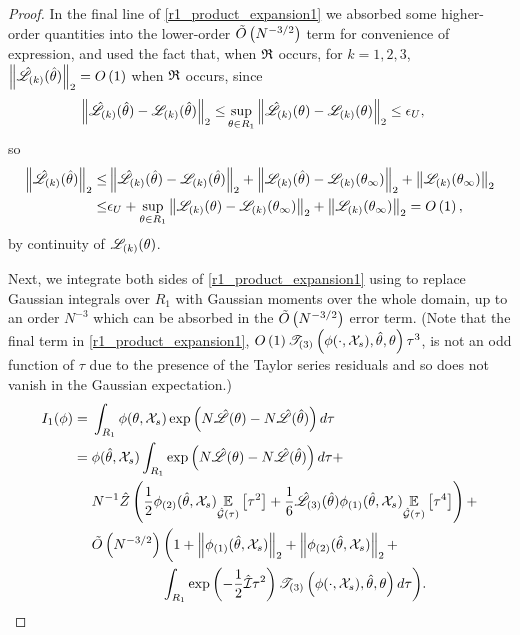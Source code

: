 \begin{lem}
\begin{proof}
In the final line of \eqref{r1_product_expansion1} we absorbed some higher-order
quantities into the lower-order $\tilde{O}\left(N^{-3/2}\right)$ term for convenience of
expression, and used the fact that, when $\mathfrak{R}$ occurs, for $k=1,2,3$,
$\left\Vert \hat{\mathscr{L}}_{(k)}(\hat\theta)\right\Vert_2 = O\left(1\right)$ when $\mathfrak{R}$ occurs, since
%
\begin{align*}
%
\norm{\likhatk{k}(\thetahat) - \likk{k}(\thetahat)}_2 \le&
    \sup_{\theta \in R_1} \norm{\likhatk{k}(\theta) - \likk{k}(\theta)}_2 \le
    \epsilon_U,
%
\end{align*}
%
so
%
\begin{align*}
%
\norm{\likhatk{k}(\thetahat)}_2 \le&
    \norm{\likhatk{k}(\thetahat) - \likk{k}(\thetahat)}_2 +
    \norm{\likk{k}(\thetahat) - \likk{k}(\thetatrue)}_2 +
    \norm{\likk{k}(\thetatrue)}_2 \\
\le&
    \epsilon_U +
    \sup_{\theta \in R_1} \norm{\likk{k}(\theta) - \likk{k}(\thetatrue)}_2 + \norm{\likk{k}(\thetatrue)}_2
= \ord{1},
%
\end{align*}
%
by continuity of $\mathscr{L}_{(k)}(\theta)$.

Next, we integrate both sides of \eqref{r1_product_expansion1} using
 to replace Gaussian integrals over $R_1$
with Gaussian moments over the whole domain, up to an order $N^{-3}$ which can
be absorbed in the $\tilde{O}\left(N^{-3/2}\right)$ error term.  (Note that the final term in
\eqref{r1_product_expansion1}, $O\left(1\right) \mathscr{T}_{(3)}\left(\phi(\cdot, {\mathcal{X}}_s), \hat\theta,
\theta\right) \tau^3$, is not an odd function of $\tau$ due to the
presence of the Taylor series residuals and so does not vanish
in the Gaussian expectation.)
%
\begin{align*}
%
I_1(\phi) ={}&
\int_{R_1} \phi(\theta, \xvec_s)
   \exp\left(N \likhat(\theta) - N \likhat(\thetahat)\right) d \tau
\\
={}&
\phi(\thetahat, \xvec_s)
\int_{R_1} \exp\left(
    N \likhat(\theta) - N \likhat(\thetahat)
\right) d\tau +
\\{}&
N^{-1} \normalizer \left(
    \frac{1}{2} \phigrad{2}(\thetahat, \xvec_s)
        \expect{\normhat}{\tau^2} +
    \frac{1}{6} \likhatk{3}(\thetahat) \phigrad{1}(\thetahat, \xvec_s)
        \expect{\normhat}{\tau^4} \right) +
\nonumber\\ &
    \ordlog{N^{-3/2}} \bigg(
        1 +
        \norm{\phigrad{1}(\thetahat, \xvec_s)}_2 +
        \norm{\phigrad{2}(\thetahat, \xvec_s)}_2 +
\nonumber\\ &
    \hspace{5em}
        \int_{R_1}
            \exp\left(-\frac{1}{2} \infohat \tau^2 \right)
            \tresid{3}{\phi(\cdot, \xvec_s), \thetahat, \theta}
            d\tau
\bigg).
%
\end{align*}


\end{proof}
\end{lem}

